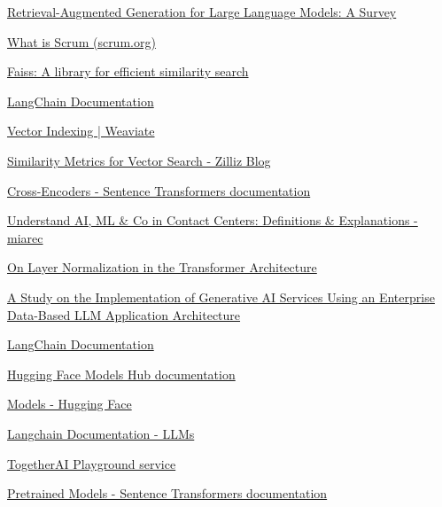 \begin{thebibliography}{9}
    \href{https://arxiv.org/html/2312.10997v5}{Retrieval-Augmented Generation for Large Language Models: A Survey}

    \href{https://www.scrum.org/resources/what-scrum-module}{What is Scrum (scrum.org)}

    \href{https://engineering.fb.com/2017/03/29/data-infrastructure/faiss-a-library-for-efficient-similarity-search/}{Faiss: A library for efficient similarity search}

    \href{https://python.langchain.com/v0.1/docs/modules/data_connection/vectorstores/}{LangChain Documentation}

    \href{https://weaviate.io/developers/weaviate/concepts/vector-index}{Vector Indexing | Weaviate}

    \href{https://zilliz.com/blog/similarity-metrics-for-vector-search}{Similarity Metrics for Vector Search - Zilliz Blog}

    \href{https://www.sbert.net/examples/applications/cross-encoder/README.html}{Cross-Encoders - Sentence Transformers documentation}

    \href{https://blog.miarec.com/contact-centers-ai-definition}{Understand AI, ML \& Co in Contact Centers: Definitions \& Explanations - miarec}

    \href{https://arxiv.org/abs/2002.04745}{On Layer Normalization in the Transformer Architecture}

    \href{https://www.oajaiml.com/uploads/archivepdf/63501191.pdf}{A Study on the Implementation of Generative AI Services Using an Enterprise Data-Based LLM Application Architecture}

    \href{https://python.langchain.com/v0.1/docs/modules/}{LangChain Documentation}

    \href{https://huggingface.co/docs/hub/models}{Hugging Face Models Hub documentation}

    \href{https://huggingface.co/models}{Models - Hugging Face}

    \href{https://python.langchain.com/v0.1/docs/integrations/llms/}{Langchain Documentation - LLMs}

    \href{https://api.together.ai/playground}{TogetherAI Playground service}

    \href{https://sbert.net/docs/sentence_transformer/pretrained_models.html}{Pretrained Models - Sentence Transformers documentation}
\end{thebibliography}